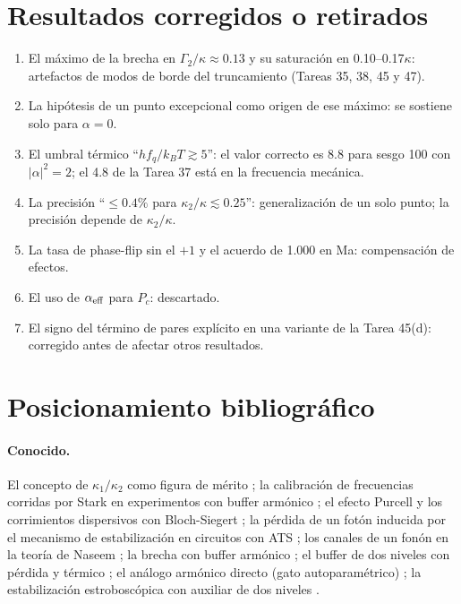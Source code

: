\documentclass[11pt]{report}
\begin{document}
\section{Resultados corregidos o retirados}

\begin{enumerate}
\item El m\'aximo de la brecha en $\Gamma_{2}/\kappa\approx0.13$ y su saturaci\'on en 0.10--0.17$\kappa$: artefactos de modos de borde del truncamiento (Tareas 35, 38, 45 y 47).
\item La hip\'otesis de un punto excepcional como origen de ese m\'aximo: se sostiene solo para $\alpha=0$.
\item El umbral t\'ermico ``$hf_{q}/k_{B}T\gtrsim5$'': el valor correcto es 8.8 para sesgo 100 con $|\alpha|^{2}=2$; el 4.8 de la Tarea 37 est\'a en la frecuencia mec\'anica.
\item La precisi\'on ``$\leq0.4\%$ para $\kappa_{2}/\kappa\lesssim0.25$'': generalizaci\'on de un solo punto; la precisi\'on depende de $\kappa_{2}/\kappa$.
\item La tasa de phase-flip sin el $+1$ y el acuerdo de 1.000 en Ma: compensaci\'on de efectos.
\item El uso de $\alpha_{\rm eff}$ para $P_{c}$: descartado.
\item El signo del t\'ermino de pares expl\'icito en una variante de la Tarea 45(d): corregido antes de afectar otros resultados.
\end{enumerate}

\section{Posicionamiento bibliogr\'afico}

\paragraph{Conocido.} El concepto de $\kappa_{1}/\kappa_{2}$ como figura de m\'erito \cite{GuillaudMirrahimi2021,Chamberland2022}; la calibraci\'on de frecuencias corridas por Stark en experimentos con buffer arm\'onico \cite{Putterman2025}; el efecto Purcell y los corrimientos dispersivos con Bloch-Siegert \cite{Zueco2009}; la p\'erdida de un fot\'on inducida por el mecanismo de estabilizaci\'on en circuitos con ATS \cite{Carde2024}; los canales de un fon\'on en la teor\'ia de Naseem \cite{Naseem2026}; la brecha con buffer arm\'onico \cite{Ferrari2026}; el buffer de dos niveles con p\'erdida y t\'ermico \cite{Gautier2022}; el an\'alogo arm\'onico directo (gato autoparam\'etrico) \cite{Marquet2024}; la estabilizaci\'on estrobosc\'opica con auxiliar de dos niveles \cite{Hillmann2026}.
\end{document}

